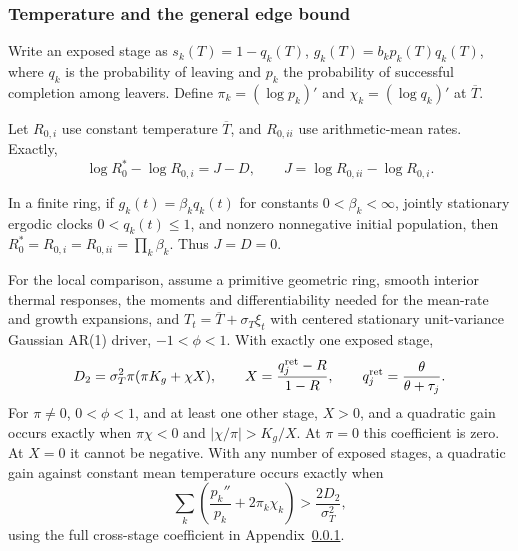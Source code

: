 \subsubsection{Temperature and the general edge bound}\label{app:mech-temperature}
Write an exposed stage as \(s_k(T)=1-q_k(T)\), \(g_k(T)=b_kp_k(T)q_k(T)\), where \(q_k\) is the probability of leaving and \(p_k\) the probability of successful completion among leavers. Define \(\pi_k=(\log p_k)'\) and \(\chi_k=(\log q_k)'\) at \(\overline T\).

Let \(R_{0,i}\) use constant temperature \(\overline T\), and \(R_{0,ii}\) use arithmetic-mean rates. Exactly,
\begin{equation}\label{eq:mech-thermal-baselines}
 \log R_0^*-\log R_{0,i}=J-D,\qquad J=\log R_{0,ii}-\log R_{0,i}.
\end{equation}

\begin{proposition}\label{prop:mech-thermal}
In a finite ring, if \(g_k(t)=\beta_kq_k(t)\) for constants \(0<\beta_k<\infty\), jointly stationary ergodic clocks \(0<q_k(t)\leq1\), and nonzero nonnegative initial population, then \(R_0^*=R_{0,i}=R_{0,ii}=\prod_k\beta_k\). Thus \(J=D=0\).

For the local comparison, assume a primitive geometric ring, smooth interior thermal responses, the moments and differentiability needed for the mean-rate and growth expansions, and \(T_t=\overline T+\sigma_T\xi_t\) with centered stationary unit-variance Gaussian AR(1) driver, \(-1<\phi<1\). With exactly one exposed stage,
\begin{equation}\label{eq:mech-thermal-sign}
 D_2=\sigma_T^2\pi(\pi K_g+\chi X),\qquad X=\frac{q_j^{\rm ret}-R}{1-R},
 \qquad q_j^{\rm ret}=\frac{\theta}{\theta+\tau_j}.
\end{equation}
For \(\pi\ne0\), \(0<\phi<1\), and at least one other stage, \(X>0\), and a quadratic gain occurs exactly when \(\pi\chi<0\) and \(|\chi/\pi|>K_g/X\). At \(\pi=0\) this coefficient is zero. At \(X=0\) it cannot be negative. With any number of exposed stages, a quadratic gain against constant mean temperature occurs exactly when
\begin{equation}\label{eq:mech-thermal-curvature}
 \sum_k\left(\frac{p_k''}{p_k}+2\pi_k\chi_k\right)>\frac{2D_2}{\sigma_T^2},
\end{equation}
using the full cross-stage coefficient in Appendix~\ref{app:mech-temperature}.
\end{proposition}

